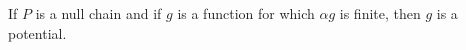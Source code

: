 If $P$ is a null chain and if $g$ is a function for which $\alpha g$ is finite, then $g$ is a potential.
